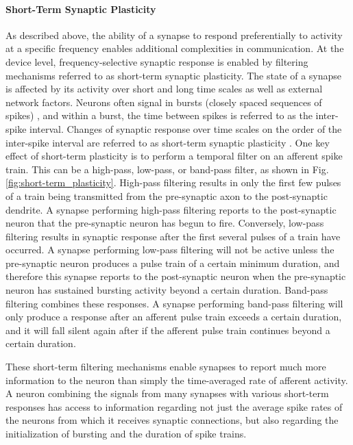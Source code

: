 \paragraph{\label{sec:short_term_plasticity}Short-Term Synaptic Plasticity}
As described above, the ability of a synapse to respond preferentially to activity at a specific frequency enables additional complexities in communication. At the device level, frequency-selective synaptic response is enabled by filtering mechanisms referred to as short-term synaptic plasticity. 
The state of a synapse is affected by its activity over short and long time scales as well as external network factors. Neurons often signal in bursts (closely spaced sequences of spikes) \cite{iz2007}, and within a burst, the time between spikes is referred to as the inter-spike interval. Changes of synaptic response over time scales on the order of the inter-spike interval are referred to as short-term synaptic plasticity \cite{abre2004}. One key effect of short-term plasticity is to perform a temporal filter on an afferent spike train. This can be a high-pass, low-pass, or band-pass filter, as shown in Fig.\,\ref{fig:short-term_plasticity}. High-pass filtering results in only the first few pulses of a train being transmitted from the pre-synaptic axon to the post-synaptic dendrite. A synapse performing high-pass filtering reports to the post-synaptic neuron that the pre-synaptic neuron has begun to fire. Conversely, low-pass filtering results in synaptic response after the first several pulses of a train have occurred. A synapse performing low-pass filtering will not be active unless the pre-synaptic neuron produces a pulse train of a certain minimum duration, and therefore this synapse reports to the post-synaptic neuron when the pre-synaptic neuron has sustained bursting activity beyond a certain duration. Band-pass filtering combines these responses. A synapse performing band-pass filtering will only produce a response after an afferent pulse train exceeds a certain duration, and it will fall silent again after if the afferent pulse train continues beyond a certain duration.

These short-term filtering mechanisms enable synapses to report much more information to the neuron than simply the time-averaged rate of afferent activity. A neuron combining the signals from many synapses with various short-term responses has access to information regarding not just the average spike rates of the neurons from which it receives synaptic connections, but also regarding the initialization of bursting and the duration of spike trains.


